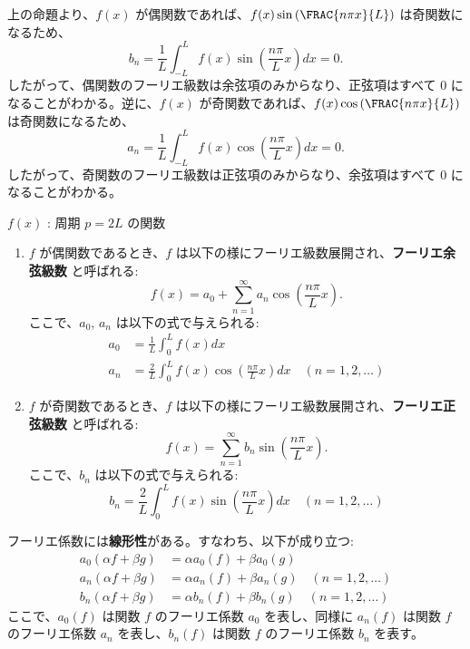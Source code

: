 \documentclass[article,paper=a4paper]{jlreq}
\begin{document}
\begin{rem}
    上の命題より、$f(x)$ が偶関数であれば、$f(x)\sin \left( \FRAC{n\pi x}{L} \right)$ は奇関数になるため、
    \[ b_n = \frac{1}{L} \int_{-L}^{L} f(x) \sin \left( \frac{n\pi}{L}x \right) dx = 0. \]
    したがって、偶関数のフーリエ級数は余弦項のみからなり、正弦項はすべて $0$ になることがわかる。逆に、$f(x)$ が奇関数であれば、$f(x)\cos \left( \FRAC{n\pi x}{L} \right)$ は奇関数になるため、
    \[ a_n = \frac{1}{L} \int_{-L}^{L} f(x) \cos \left( \frac{n\pi}{L}x \right) dx = 0. \]
    したがって、奇関数のフーリエ級数は正弦項のみからなり、余弦項はすべて $0$ になることがわかる。
\end{rem}

\begin{thm}
    \quad $f(x)$ : 周期 $p=2L$ の関数\par
    \begin{enumerate}[label=(\arabic*)\,]
        \item $f$ が偶関数であるとき、$f$ は以下の様にフーリエ級数展開され、\textbf{フーリエ余弦級数} と呼ばれる:
        \[f(x) = a_0 + \sum_{n=1}^{\infty} a_n \cos \left( \frac{n\pi}{L}x \right) . \]
        ここで、$a_0$, $a_n$ は以下の式で与えられる:
        \begin{align*}
            a_0 &= \frac{1}{L} \int_{0}^{L} f(x) dx \\
            a_n &= \frac{2}{L} \int_{0}^{L} f(x) \cos \left( \frac{n\pi}{L}x \right) dx \quad (n = 1, 2, \ldots)
        \end{align*}
        \item $f$ が奇関数であるとき、$f$ は以下の様にフーリエ級数展開され、\textbf{フーリエ正弦級数} と呼ばれる:
        \[f(x) = \sum_{n=1}^{\infty} b_n \sin \left( \frac{n\pi}{L}x \right) . \]
        ここで、$b_n$ は以下の式で与えられる:
        \[b_n = \frac{2}{L} \int_{0}^{L} f(x) \sin \left( \frac{n\pi}{L}x \right) dx \quad (n = 1, 2, \ldots)\] 
    \end{enumerate}
\end{thm}

\begin{thm}
    フーリエ係数には\textbf{線形性}がある。すなわち、以下が成り立つ:
\begin{align*}
    a_0(\alpha f + \beta g) &= \alpha a_0(f) + \beta a_0(g) \\
    a_n(\alpha f + \beta g) &= \alpha a_n(f) + \beta a_n(g) \quad (n = 1, 2, \ldots) \\
    b_n(\alpha f + \beta g) &= \alpha b_n(f) + \beta b_n(g) \quad (n = 1, 2, \ldots)
\end{align*}
    ここで、$a_0(f)$ は関数 $f$ のフーリエ係数 $a_0$ を表し、同様に $a_n(f)$ は関数 $f$ のフーリエ係数 $a_n$ を表し、$b_n(f)$ は関数 $f$ のフーリエ係数 $b_n$ を表す。
\end{thm}
\end{document}

